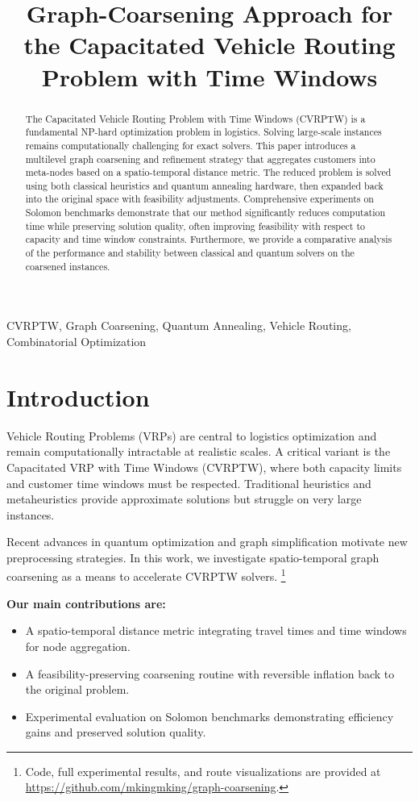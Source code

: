 \documentclass[conference]{IEEEtran}
\title{Graph-Coarsening Approach for the Capacitated Vehicle Routing Problem with Time Windows}
\author{
    \IEEEauthorblockN{Mustafa Mert Özyılmaz}
    \IEEEauthorblockA{
        Sorbonne Université \\
        Email: mustafa\_mert.ozyilmaz@etu.sorbonne-universite.fr
    }
}
\begin{document}
\maketitle

\begin{abstract}
The Capacitated Vehicle Routing Problem with Time Windows (CVRPTW) is a fundamental NP-hard optimization problem in logistics. Solving large-scale instances remains computationally challenging for exact solvers. This paper introduces a multilevel graph coarsening and refinement strategy that aggregates customers into meta-nodes based on a spatio-temporal distance metric.  The reduced problem is solved using both classical heuristics and quantum annealing hardware, then expanded back into the original space with feasibility adjustments. Comprehensive experiments on Solomon benchmarks demonstrate that our method significantly reduces computation time while preserving solution quality, often improving feasibility with respect to capacity and time window constraints. Furthermore, we provide a comparative analysis of the performance and stability between classical and quantum solvers on the coarsened instances.
\end{abstract} 
\begin{IEEEkeywords}
CVRPTW, Graph Coarsening, Quantum Annealing, Vehicle Routing, Combinatorial Optimization
\end{IEEEkeywords}
\section{Introduction}
Vehicle Routing Problems (VRPs) are central to logistics optimization and remain computationally intractable at realistic scales. A critical variant is the Capacitated VRP with Time Windows (CVRPTW), where both capacity limits and customer time windows must be respected. Traditional heuristics and metaheuristics provide approximate solutions but struggle on very large instances.

Recent advances in quantum optimization and graph simplification motivate new preprocessing strategies. In this work, we investigate spatio-temporal graph coarsening as a means to accelerate CVRPTW solvers.
\footnote{Code, full experimental results, and route visualizations are provided at \url{https://github.com/mkingmking/graph-coarsening}.}


\textbf{Our main contributions are:}
\begin{itemize}
  \item A spatio-temporal distance metric integrating travel times and time windows for node aggregation.  
  \item A feasibility-preserving coarsening routine with reversible inflation back to the original problem.  
  \item Experimental evaluation on Solomon benchmarks demonstrating efficiency gains and preserved solution quality.  
\end{itemize}
\end{document}
